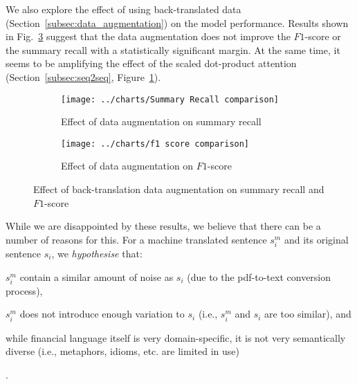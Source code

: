 We also explore the effect of using back-translated data (Section~\ref{subsec:data_augmentation}) on the model performance.
Results shown in Fig.~\ref{fig:data_augmentation_effect} suggest that the data augmentation does not improve the $F1$-score or the summary recall with a statistically significant margin.
At the same time, it seems to be amplifying the effect of the scaled dot-product attention (Section~\ref{subsec:seq2seq}, Figure~\ref{fig:summary_recall_data_augmentation_effect}).
\begin{figure}[ht]
    \begin{subfigure}{0.49\textwidth}
        \centering \texttt{[image: ../charts/Summary Recall comparison]}
        \caption{Effect of data augmentation on summary recall}
        \label{fig:summary_recall_data_augmentation_effect}
    \end{subfigure}%
    \hfill
    \begin{subfigure}{0.49\textwidth}
        \centering
        \texttt{[image: ../charts/f1 score comparison]}
        \caption{Effect of data augmentation on $F1$-score}
        \label{fig:f1_score_comparison_data_augmentation_effect}
    \end{subfigure}
    \caption{Effect of back-translation data augmentation on summary recall and $F1$-score}
    \label{fig:data_augmentation_effect}
\end{figure}
While we are disappointed by these results, we believe that there can be a number of reasons for this.
For a machine translated sentence $s^m_i$ and its original sentence $s_i$, we \hypertarget{data_augment_hypothesis}{\emph{hypothesise}} that:
\begin{enumerate*}
    \item $s^m_i$ contain a similar amount of noise as $s_i$ (due to the pdf-to-text conversion process),
    \item $s^m_i$ does not introduce enough variation to $s_i$ (i.e., $s^m_i$ and $s_i$ are too similar), and
    \item while financial language itself is very domain-specific, it is not very semantically diverse (i.e., metaphors, idioms, etc. are limited in use)
\end{enumerate*}.

